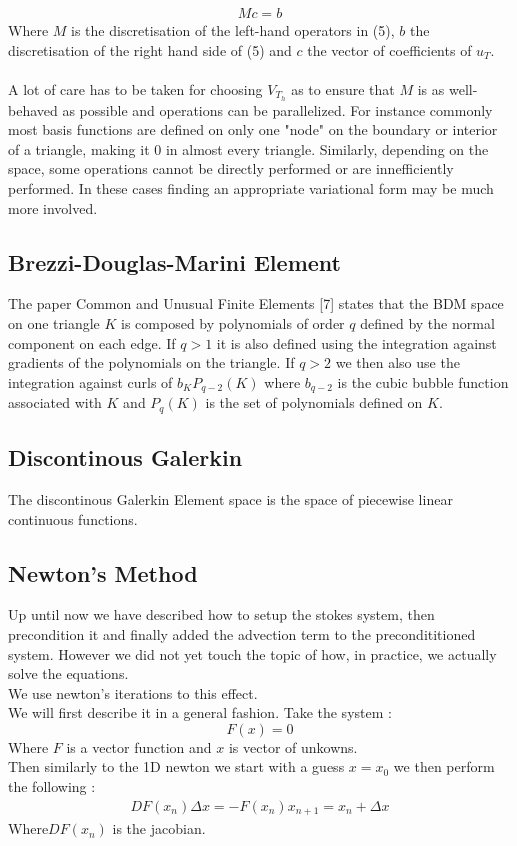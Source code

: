 \documentclass[11pt,twoside,a4paper]{article}
\begin{document}
\begin{align}
Mc=b
\end{align}
Where $M$ is the discretisation of the left-hand operators in (5), $b$ the discretisation of the right hand side of (5) and $c$ the vector of coefficients of $u_T$.\\
\\
A lot of care has to be taken for choosing $V_{T_h}$ as to ensure that $M$ is as well-behaved as possible and operations can be parallelized. For instance commonly most basis functions are defined on only one "node" on the boundary or interior of a triangle, making it $0$ in almost every triangle. Similarly, depending on the space, some operations cannot be directly performed or are innefficiently performed. In these cases finding an appropriate variational form may be much more involved.

\subsection{Brezzi-Douglas-Marini Element}
The paper Common and Unusual Finite Elements [7] states that the BDM space on one triangle $K$ is composed by polynomials of order $q$ defined by the normal component on each edge. If $q > 1$ it is also defined using the integration against gradients of the polynomials on the triangle. If $q > 2$ we then also use the integration  against curls of $b_K P_{q-2}(K)$ where $b_{q-2}$ is the  cubic bubble function associated with $K$ and $P_{q}(K)$ is the set of polynomials defined on $K$.


\subsection{Discontinous Galerkin}
The discontinous Galerkin Element space is the space of piecewise linear continuous functions.

\subsection{Newton's Method}
Up until now we have described how to setup the stokes system, then precondition it and finally added the advection term to the precondititioned system. However we did not yet touch the topic of how, in practice, we actually solve the equations.\\
We use newton's iterations to this effect.\\
We will first describe it in a general fashion. Take the system :
$$
F(x) = 0
$$
Where $F$ is a vector function and $x$ is vector of unkowns.\\
Then similarly to the 1D newton we start with a guess $x = x_0$ we then perform the following :
\begin{align}
DF(x_n) \Delta x = - F(x_n)
x_{n+1} = x_n + \Delta x 
\end{align}
Where$DF(x_n)$ is the jacobian.
\end{document}
